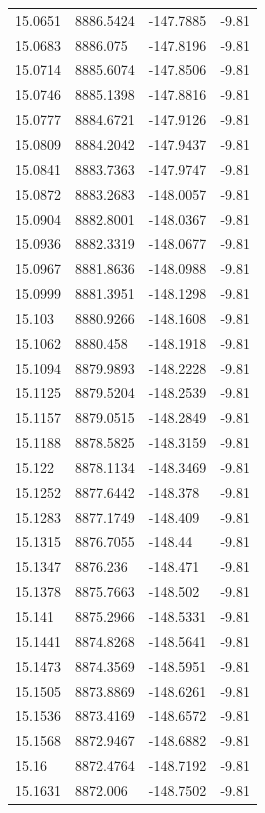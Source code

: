 \begin{table}[H]
\begin{tabular}{llll}
15.0651 & 8886.5424 & -147.7885 & -9.81 \\
15.0683 & 8886.075 & -147.8196 & -9.81 \\
15.0714 & 8885.6074 & -147.8506 & -9.81 \\
15.0746 & 8885.1398 & -147.8816 & -9.81 \\
15.0777 & 8884.6721 & -147.9126 & -9.81 \\
15.0809 & 8884.2042 & -147.9437 & -9.81 \\
15.0841 & 8883.7363 & -147.9747 & -9.81 \\
15.0872 & 8883.2683 & -148.0057 & -9.81 \\
15.0904 & 8882.8001 & -148.0367 & -9.81 \\
15.0936 & 8882.3319 & -148.0677 & -9.81 \\
15.0967 & 8881.8636 & -148.0988 & -9.81 \\
15.0999 & 8881.3951 & -148.1298 & -9.81 \\
15.103 & 8880.9266 & -148.1608 & -9.81 \\
15.1062 & 8880.458 & -148.1918 & -9.81 \\
15.1094 & 8879.9893 & -148.2228 & -9.81 \\
15.1125 & 8879.5204 & -148.2539 & -9.81 \\
15.1157 & 8879.0515 & -148.2849 & -9.81 \\
15.1188 & 8878.5825 & -148.3159 & -9.81 \\
15.122 & 8878.1134 & -148.3469 & -9.81 \\
15.1252 & 8877.6442 & -148.378 & -9.81 \\
15.1283 & 8877.1749 & -148.409 & -9.81 \\
15.1315 & 8876.7055 & -148.44 & -9.81 \\
15.1347 & 8876.236 & -148.471 & -9.81 \\
15.1378 & 8875.7663 & -148.502 & -9.81 \\
15.141 & 8875.2966 & -148.5331 & -9.81 \\
15.1441 & 8874.8268 & -148.5641 & -9.81 \\
15.1473 & 8874.3569 & -148.5951 & -9.81 \\
15.1505 & 8873.8869 & -148.6261 & -9.81 \\
15.1536 & 8873.4169 & -148.6572 & -9.81 \\
15.1568 & 8872.9467 & -148.6882 & -9.81 \\
15.16 & 8872.4764 & -148.7192 & -9.81 \\
15.1631 & 8872.006 & -148.7502 & -9.81 \\

\end{tabular}
\end{table}
